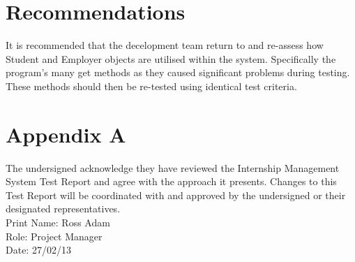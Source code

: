 \documentclass{l3deliverable}
\begin{document}
\section{Recommendations}
It is recommended that the decelopment team return to and re-assess how Student and Employer objects are utilised within the system. Specifically the program's many get methods as they caused significant problems during testing. These methods should then be re-tested using identical test criteria.
\newpage
\section{Appendix A}
The undersigned acknowledge they have reviewed the Internship Management System Test Report and agree with the approach it presents. Changes to this Test Report will be coordinated with and approved by the undersigned or their designated representatives.\\
Print Name: Ross Adam \\
Role: Project Manager \\
Date: 27/02/13\\
\end{document}
